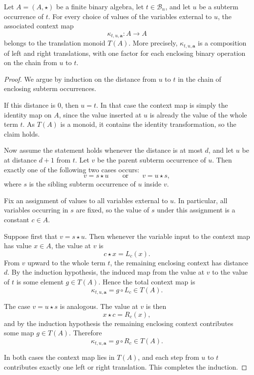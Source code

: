 \documentclass[10pt,a4paper]{amsart}
\begin{document}
\begin{theorem}\label{thm:context-in-translation-monoid}
Let \(A=(A,\star)\) be a finite binary algebra, let \(t\in \mathcal B_n\), and
let \(u\) be a subterm occurrence of \(t\). For every choice of values of the
variables external to \(u\), the associated context map
\[
\kappa_{t,u,\mathbf a}:A\to A
\]
belongs to the translation monoid \(T(A)\). More precisely,
\(\kappa_{t,u,\mathbf a}\) is a composition of left and right translations,
with one factor for each enclosing binary operation on the chain from \(u\) to
\(t\).
\end{theorem}

\begin{proof}
We argue by induction on the distance from \(u\) to \(t\) in the chain of
enclosing subterm occurrences.

If this distance is \(0\), then \(u=t\). In that case the context map is simply
the identity map on \(A\), since the value inserted at \(u\) is already the
value of the whole term \(t\). As \(T(A)\) is a monoid, it contains the
identity transformation, so the claim holds.

Now assume the statement holds whenever the distance is at most \(d\), and let
\(u\) be at distance \(d+1\) from \(t\). Let \(v\) be the parent subterm
occurrence of \(u\). Then exactly one of the following two cases occurs:
\[
v=s\star u
\qquad\text{or}\qquad
v=u\star s,
\]
where \(s\) is the sibling subterm occurrence of \(u\) inside \(v\).

Fix an assignment of values to all variables external to \(u\). In particular,
all variables occurring in \(s\) are fixed, so the value of \(s\) under this
assignment is a constant \(c\in A\).

Suppose first that \(v=s\star u\). Then whenever the variable input to the
context map has value \(x\in A\), the value at \(v\) is
\[
c\star x=L_c(x).
\]
From \(v\) upward to the whole term \(t\), the remaining enclosing context has
distance \(d\). By the induction hypothesis, the induced map from the value at
\(v\) to the value of \(t\) is some element \(g\in T(A)\). Hence the total
context map is
\[
\kappa_{t,u,\mathbf a}=g\circ L_c \in T(A).
\]

The case \(v=u\star s\) is analogous. The value at \(v\) is then
\[
x\star c = R_c(x),
\]
and by the induction hypothesis the remaining enclosing context contributes some
map \(g\in T(A)\). Therefore
\[
\kappa_{t,u,\mathbf a}=g\circ R_c \in T(A).
\]

In both cases the context map lies in \(T(A)\), and each step from \(u\) to
\(t\) contributes exactly one left or right translation. This completes the
induction.
\end{proof}
\end{document}
